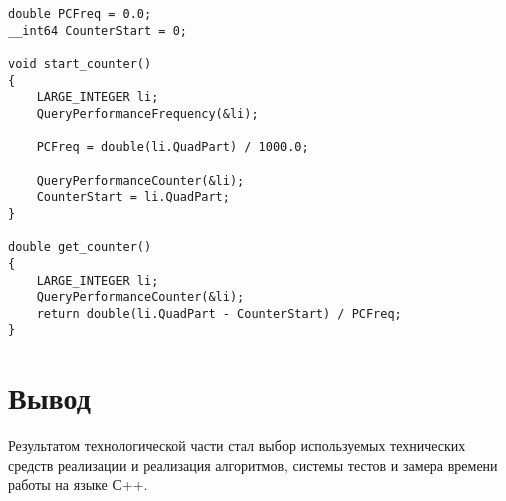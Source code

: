 \begin{lstlisting}[caption = {Функции замера процессорного времени работы функции}]
double PCFreq = 0.0;
__int64 CounterStart = 0;

void start_counter()
{
	LARGE_INTEGER li;
	QueryPerformanceFrequency(&li);
	
	PCFreq = double(li.QuadPart) / 1000.0;
	
	QueryPerformanceCounter(&li);
	CounterStart = li.QuadPart;
}

double get_counter()
{
	LARGE_INTEGER li;
	QueryPerformanceCounter(&li);
	return double(li.QuadPart - CounterStart) / PCFreq;
}
\end{lstlisting}

\section*{Вывод}
Результатом технологической части стал выбор используемых технических средств реализации и реализация алгоритмов, системы тестов и замера времени работы на языке С++.
